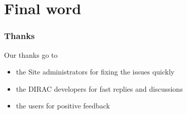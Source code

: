 \documentclass[10pt,table,dvipsnames]{beamer}
\begin{document}
\section{Final word}
\begin{frame}
\frametitle{Thanks}

Our thanks go to 
\begin{itemize}
\item the Site administrators for fixing the issues quickly
\item the DIRAC developers for fast replies and discussions
\item the users for positive feedback
\end{itemize}

\label{lastframe}
\end{frame} 
\end{document}
